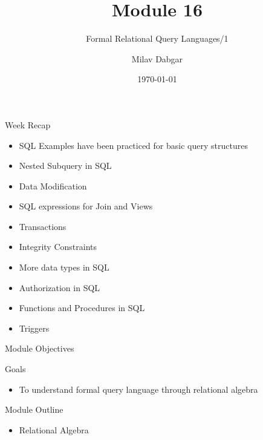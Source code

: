 \documentclass[aspectratio=169, xcolor=dvipsnames]{beamer}
\title{Module 16}
\subtitle{Formal Relational Query Languages/1}
\author{Milav Dabgar}
\institute{www.milav.in}
\date{\today}
\begin{document}
\begin{frame}
    \titlepage
\end{frame}

\begin{frame}{Week Recap}
    \begin{itemize}[<+->]
        \item SQL Examples have been practiced for basic query structures
        \item Nested Subquery in SQL
        \item Data Modification
        \item SQL expressions for Join and Views
        \item Transactions
        \item Integrity Constraints
        \item More data types in SQL
        \item Authorization in SQL
        \item Functions and Procedures in SQL
        \item Triggers
    \end{itemize}
\end{frame}

\begin{frame}{Module Objectives}
    \begin{block}{Goals}
        \begin{itemize}[<+->]
            \item To understand formal query language through relational algebra
        \end{itemize}
    \end{block}
\end{frame}

\begin{frame}{Module Outline}
    \begin{itemize}[<+->]
        \item Relational Algebra
    \end{itemize}
\end{frame}
\end{document}
